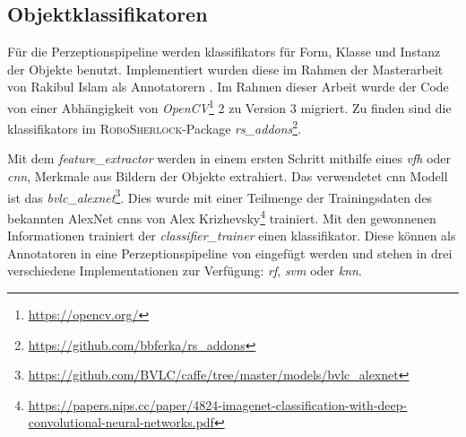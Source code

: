 \subsection{Objektklassifikatoren}
\label{sec:classifiers}
Für die Perzeptionspipeline werden \glspl{klassifikator} für Form, Klasse und Instanz der Objekte benutzt. Implementiert wurden diese im Rahmen der Masterarbeit von Rakibul Islam als \robosherlock Annotatorern \cite{rakib}. Im Rahmen dieser Arbeit wurde der Code von einer Abhängigkeit von \textit{OpenCV}\footnote{\url{https://opencv.org/}} 2 zu Version 3 migriert. Zu finden sind die \glspl{klassifikator} im \textsc{RoboSherlock}-Package \textit{rs\_addons}\footnote{\url{https://github.com/bbferka/rs\_addons}}. \par
Mit dem \textit{feature\_extractor} werden in einem ersten Schritt mithilfe eines \textit{\gls{vfh}} oder \textit{\gls{cnn}}, Merkmale aus Bildern der Objekte extrahiert. Das verwendetet \gls{cnn} Modell ist das \textit{bvlc\_alexnet}\footnote{\url{https://github.com/BVLC/caffe/tree/master/models/bvlc\_alexnet}}. Dies wurde mit einer Teilmenge der Trainingsdaten des bekannten AlexNet \gls{cnn}s von Alex Krizhevsky\footnote{\url{https://papers.nips.cc/paper/4824-imagenet-classification-with-deep-convolutional-neural-networks.pdf}} trainiert. Mit den gewonnenen Informationen trainiert der \textit{classifier\_trainer} einen \gls{klassifikator}. Diese können als Annotatoren in eine Perzeptionspipeline von \robosherlock eingefügt werden und stehen in drei verschiedene Implementationen zur Verfügung: \textit{\gls{rf}}, \textit{\gls{svm}} oder \textit{\gls{knn}}.

